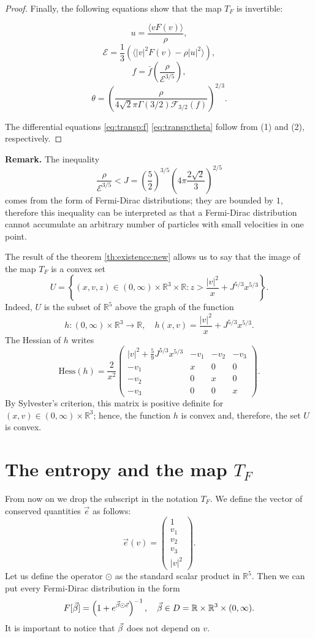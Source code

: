 \begin{proof}
Finally, the following equations show that the map $T_F$ is invertible:

\[u = \frac{\langle vF(v) \rangle}{\rho},\]
\[\mathcal E = \frac 13 \left(\langle |v|^2F(v) - \rho|u|^2\rangle\right) ,\]
\[f=\bar f\left( \frac{\rho}{\mathcal E^{3/5}}\right),\]
\[\theta = \left(\frac{\rho}{ 4\sqrt 2\pi\Gamma(3/2)\mathcal F_{3/2}(f)}\right)^{2/3}.\]

The differential equations \eqref{eq:transp:f} \eqref{eq:transp:theta}   follow  from (1) and (2), respectively.

\end{proof}
\textbf{Remark.} The inequality
\begin{equation}
\frac{\rho}{\mathcal
E^{3/5}}<J=\left(\frac 52\right)^{3/5}\left(4\pi 
\frac{2\sqrt 2}{3}\right)^{2/5}\end{equation}
comes from the form of Fermi-Dirac distributions; they are bounded by $1$, therefore this inequality can be interpreted as that a Fermi-Dirac distribution cannot accumulate an arbitrary number of particles with small velocities in one point.

The result of the theorem \ref{th:existence:new} allows us to say that the image of the map $T_F$ is a convex set
\begin{equation}\label{eq:U}
	 U=\left\{(x,v,z)\in(0,\infty)\times \mathbb R^3\times \mathbb R:z>\frac{|v|^2}{x}+J^{5/3}x^{5/3}\right\}. 
\end{equation}
Indeed, $U$ is the subset of $\mathbb R^5$ above the graph of the function \[h: (0,\infty)\times \mathbb R^3\to\mathbb R,\quad h(x,v) = \frac{|v|^2}{x}+J^{5/3}x^{5/3}.\]
	The Hessian of $h$ writes 
	\[\mathrm{Hess}(h)=\frac{2}{x^2}\begin{pmatrix}
		{|v|^2}+\frac{5}{9}J^{5/3}x^{5/3}&-v_1&-v_2&-v_3\\
		-v_1&x &0&0\\
		-v_2&0&x &0\\
		-v_3&0&0&x 		
	\end{pmatrix}.
	\]
	By Sylvester's criterion, this matrix is positive definite for $(x,v)\in (0,\infty)\times \mathbb R^3$; hence, the function $h$ is convex and, therefore, the set $U$ is convex.

  
\section{The entropy and the map \texorpdfstring{$T_F$}{T  F } } %
\label{sec:entropy} From now on we drop the subscript in the notation $T_F$. 
We define the vector of conserved quantities $\vec e$ as follows:\[\vec e(v)
=\begin{pmatrix}1\\v_1\\v_2\\v_3\\|v|^2
\end{pmatrix}.\]
Let us define the operator $\odot$ as the standard scalar product in $\mathbb R^5$.
Then  we can put every
Fermi-Dirac distribution in the form
\[F[{\vec\beta}] = \left(1+e^{{\vec\beta}\odot\vec e}\right)^{-1},\quad {\vec\beta}
\in D= \mathbb R\times \mathbb R^3\times(0,\infty).\]
It is important to notice that ${\vec\beta}$ does not depend on $v$.

